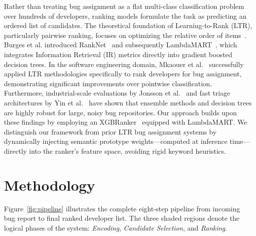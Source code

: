 \documentclass[sigconf,review,anonymous]{acmart}
\begin{document}
Rather than treating bug assignment as a flat multi-class classification problem over hundreds of developers, ranking models formulate the task as predicting an ordered list of candidates. The theoretical foundation of Learning-to-Rank (LTR), particularly pairwise ranking, focuses on optimizing the relative order of items~\cite{liu2009ltr}. Burges et al. introduced RankNet~\cite{burges2005lambdarank} and subsequently LambdaMART~\cite{burges2010lambdamart}, which integrates Information Retrieval (IR) metrics directly into gradient boosted decision trees. In the software engineering domain, Mkaouer et al.~\cite{mkaouer2020ltrdevs} successfully applied LTR methodologies specifically to rank developers for bug assignment, demonstrating significant improvements over pointwise classification. Furthermore, industrial-scale evaluations by Jonsson et al.~\cite{jonsson2016deeplearning} and fast triage architectures by Yin et al.~\cite{yin2018elm} have shown that ensemble methods and decision trees are highly robust for large, noisy bug repositories. Our approach builds upon these findings by employing an XGBRanker~\cite{chen2016xgboost} equipped with LambdaMART. We distinguish our framework from prior LTR bug assignment systems by dynamically injecting semantic prototype weights---computed at inference time---directly into the ranker's feature space, avoiding rigid keyword heuristics.

\section{Methodology}



Figure~\ref{fig:pipeline} illustrates the complete eight-step pipeline from
incoming bug report to final ranked developer list.
The three shaded regions denote the logical phases of the system:
\emph{Encoding}, \emph{Candidate Selection}, and \emph{Ranking}.
\end{document}
